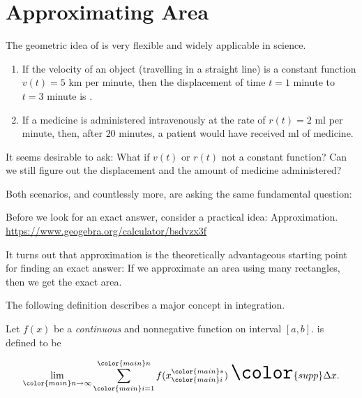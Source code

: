 \documentclass[../main.tex]{subfiles}
\begin{document}
 \section{Approximating Area}
The geometric idea of  is very flexible and widely applicable in science.  

\begin{enumerate}[wide]
  \item If the velocity of an object (travelling in a straight line) is a constant function \(v(t) = 5\) km per minute, then the displacement of time \(t = 1\) minute to \(t = 3\) minute is \underline{\hspace{2in}}.

  \item If a medicine is administered intravenously at the rate of \(r(t) = 2\) ml per minute, then, after \(20\) minutes, a patient would have received \underline{\hspace{3in}} ml of medicine.
\end{enumerate}

It seems desirable to ask: What if \(v(t)\) or \(r(t)\) not a constant function? Can we still figure out the displacement and the amount of medicine administered?

Both scenarios, and countlessly more, are asking the same fundamental  question:


Before we look for an exact answer, consider a practical idea: Approximation. \\
\url{https://www.geogebra.org/calculator/bsdvzx3f}

It turns out that approximation is the theoretically advantageous starting point for finding an exact answer: If we approximate an area using \underline{\hspace{2in}} many rectangles, then we get the exact area.

The following definition describes a major concept in integration. 

\begin{mdframed}[style=withref-compact]
  Let \(f(x)\) be a \emph{continuous} and nonnegative function on interval \([a,b]\).  is defined to be

  \begin{equation} \label{eq:area-under-the-curve} \huge
    \lim_{{\color{main}n} \to \infty} \sum_{{\color{main}i}=1}^{{\color{main}n}} f(x_{{\color{main}i}}^{{\color{main}*}}) \; {\color{supp} \Delta x}.
  \end{equation}

\end{mdframed}
\end{document}
